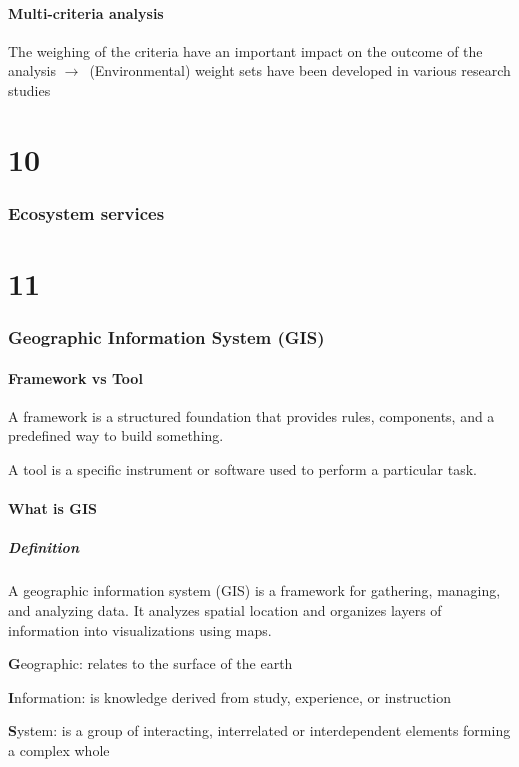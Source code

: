 \documentclass{article}
\begin{document}
\subsection{Multi-criteria analysis}
The weighing of the criteria have an important impact on the outcome of the analysis
$\to$\ (Environmental) weight sets have been developed in various research studies

\part{10}
\section{Ecosystem services}

\part{11}
\section{Geographic Information System (GIS)}
\subsection{Framework vs Tool}
A framework is a structured foundation that provides rules,
components, and a predefined way to build something.

A tool is a specific instrument or software used to perform a
particular task.

\subsection{What is GIS}
\subsubsection{Definition}
A geographic information system (GIS) is a framework for gathering, managing, and analyzing data. It
analyzes spatial location and organizes layers of information into visualizations using maps.

\textbf{G}eographic: relates to the surface of the earth

\textbf{I}nformation: is knowledge derived from study, experience, or instruction

\textbf{S}ystem: is a group of interacting, interrelated or
interdependent elements forming a complex whole
\end{document}
